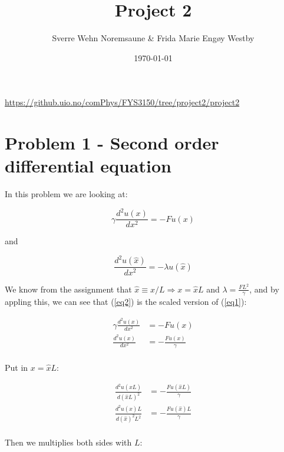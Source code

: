 \documentclass[english,notitlepage]{revtex4-1}  %
\begin{document}
\title{Project 2}      %
\author{Sverre Wehn Noremsaune \& Frida Marie Engøy Westby}          %
\date{\today}                             %
\noaffiliation                            %


\maketitle 
    
\begin{center}
	\url{https://github.uio.no/comPhys/FYS3150/tree/project2/project2}
\end{center}


\section*{Problem 1 - Second order differential equation}
In this problem we are looking at:

\begin{equation}
    \gamma \frac{d^2u(x)}{dx^2} = -Fu(x) \label{eq1}
\end{equation}

and 

\begin{equation}
    \frac{d^2 u(\hat{x})}{dx^2} = - \lambda u(\hat{x}) \label{eq2}
\end{equation}

We know from the assignment that $\hat{x} \equiv x/L \Rightarrow x = \hat{x}L$ and $\lambda = \frac{FL^2}{\gamma}$, and by appling this, we can see that (\ref{eq2}) is the scaled version of (\ref{eq1}): 

\begin{align*}
    \gamma \frac{d^2u(x)}{dx^2} &= -Fu(x)\\
    \frac{d^2u(x)}{dx^2} &= - \frac{Fu(x)}{\gamma}\\
\end{align*}

Put in $x = \hat{x}L$:

\begin{align*}
    \frac{d^2u(\hat{x}L)}{d(\hat{x}L)^2} &= - \frac{Fu(\hat{x}L)}{\gamma}\\
    \frac{d^2u(\hat{x})L}{d(\hat{x})^2L^2} &= - \frac{Fu(\hat{x})L}{\gamma}\\
\end{align*}

Then we multiplies both sides with $L$:
\end{document}
